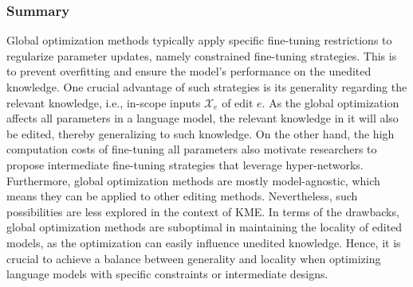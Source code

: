 \documentclass[acmsmall, screen]{acmart}
\begin{document}

\subsubsection{\textbf{Summary}}
Global optimization methods typically apply specific fine-tuning restrictions to regularize parameter updates, namely constrained fine-tuning strategies. This is to prevent overfitting and ensure the model's performance on the unedited knowledge. One crucial advantage of such strategies is its generality regarding the relevant knowledge, i.e., in-scope inputs $\mathcal{X}_e$ of edit $e$. As the global optimization affects all parameters in a language model, the relevant knowledge in it will also be edited, thereby generalizing to such knowledge. On the other hand, the high computation costs of fine-tuning all parameters also motivate researchers to propose intermediate fine-tuning strategies that leverage hyper-networks. Furthermore, global optimization methods are mostly model-agnostic, which means they can be applied to other editing methods. Nevertheless, such possibilities are less explored in the context of KME. In terms of the drawbacks, global optimization methods are suboptimal in maintaining the locality of edited models, as the optimization can easily influence unedited knowledge. Hence, it is crucial to achieve a balance between generality and locality when optimizing language models with specific constraints or intermediate designs.
\end{document}
